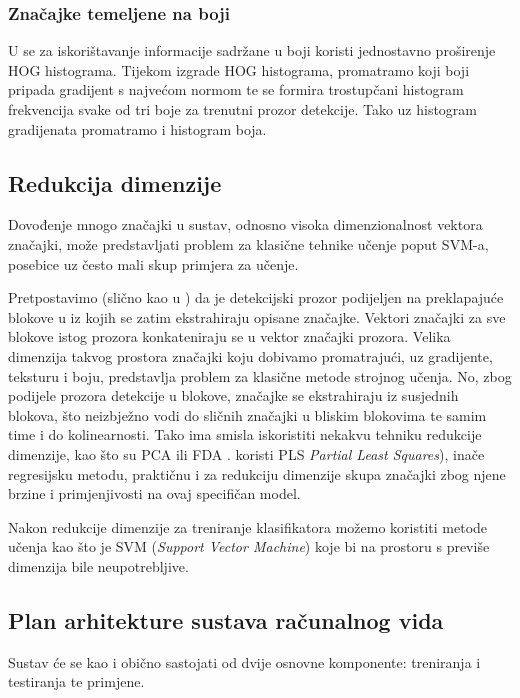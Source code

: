 \documentclass[seminar]{fer}
\begin{document}
\subsubsection{Značajke temeljene na boji}

U \cite{Schwartz} se za iskorištavanje informacije sadržane u boji koristi jednostavno proširenje HOG histograma. Tijekom izgrade HOG histograma, promatramo koji boji pripada gradijent s najvećom normom te se formira trostupčani histogram frekvencija svake od tri boje za trenutni prozor detekcije. Tako uz histogram gradijenata promatramo i histogram boja.

\subsection{Redukcija dimenzije}

Dovođenje mnogo značajki u sustav, odnosno visoka dimenzionalnost vektora značajki, može predstavljati problem za klasične tehnike učenje poput SVM-a, posebice uz često mali skup primjera za učenje.

Pretpostavimo (slično kao u \cite{Schwartz}) da je detekcijski prozor podijeljen na preklapajuće blokove u iz kojih se zatim ekstrahiraju opisane značajke. Vektori značajki za sve blokove istog prozora konkateniraju se u vektor značajki prozora. Velika dimenzija takvog prostora značajki koju dobivamo promatrajući, uz gradijente, teksturu i boju, predstavlja problem za klasične metode strojnog učenja. No, zbog podijele prozora detekcije u blokove, značajke se ekstrahiraju iz susjednih blokova, što neizbježno vodi do sličnih značajki u bliskim blokovima te samim time i do kolinearnosti. Tako ima smisla iskoristiti nekakvu tehniku redukcije dimenzije, kao što su
PCA  ili FDA . \cite{Schwartz} koristi PLS \emph{Partial Least Squares}), inače 
regresijsku metodu, praktičnu i za redukciju dimenzije skupa značajki zbog njene brzine i primjenjivosti na ovaj specifičan model.

Nakon redukcije dimenzije za treniranje klasifikatora možemo koristiti metode učenja kao što je SVM (\emph{Support Vector Machine}) koje bi na prostoru s 
previše dimenzija bile neupotrebljive.

\subsection{Plan arhitekture sustava računalnog vida}

Sustav će se kao i obično sastojati od dvije osnovne komponente: treniranja i testiranja te primjene.
\end{document}

